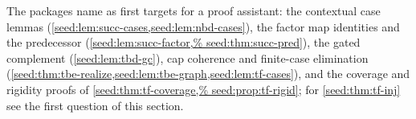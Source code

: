 \begin{question}[Formalization]
The packages name as first targets for a proof assistant: the contextual
case lemmas (\cref{seed:lem:succ-cases,seed:lem:nbd-cases}), the factor map
identities and the predecessor (\cref{seed:lem:succ-factor,%
seed:thm:succ-pred}), the gated complement (\cref{seed:lem:tbd-gc}), cap
coherence and finite-case elimination
(\cref{seed:thm:tbe-realize,seed:lem:tbe-graph,seed:lem:tf-cases}), and the
coverage and rigidity proofs of \cref{seed:thm:tf-coverage,%
seed:prop:tf-rigid}; for \cref{seed:thm:tf-inj} see the first question of
this section.
\end{question}

